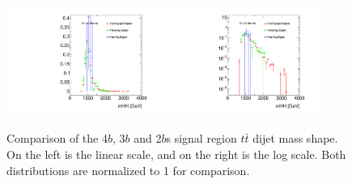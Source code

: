 \begin{figure}[htbp!]
\begin{center}
\includegraphics[width=0.45\textwidth,angle=-90]{figures/boosted/Other/ttbar_compare_mHH_l.pdf}
\includegraphics[width=0.45\textwidth,angle=-90]{figures/boosted/Other/ttbar_compare_mHH_l_1.pdf}
\caption{Comparison of the 4$b$, 3$b$ and 2$b$s signal region $t\bar{t}$ dijet mass shape. On the left is the linear scale, and on the right is the log scale. Both distributions are normalized to 1 for comparison.}
\label{fig:signal-region-ttbar-compare}
\end{center}
\end{figure}


